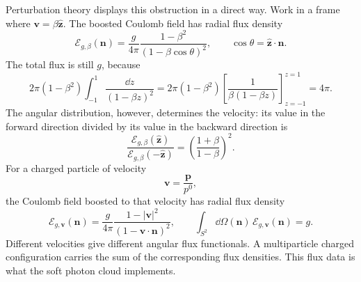 Perturbation theory displays this obstruction in a direct way.  Work in a
frame where \(\mathbf v=\beta\widehat{\mathbf z}\).  The boosted Coulomb
field has radial flux density
\[
  \mathcal E_{g,\beta}(\mathbf n)
  =
  \frac{g}{4\pi}
  \frac{1-\beta^2}{(1-\beta\cos\theta)^2},
  \qquad
  \cos\theta=\widehat{\mathbf z}\cdot\mathbf n .
\]
The total flux is still \(g\), because
\begin{equation}
  2\pi(1-\beta^2)\int_{-1}^{1}
  \frac{\dd z}{(1-\beta z)^2}
  =
  2\pi(1-\beta^2)
  \left[
    \frac1{\beta(1-\beta z)}
  \right]_{z=-1}^{z=1}
  =
  4\pi .
  \label{eq:boosted-coulomb-flux-normalization}
\end{equation}
The angular distribution, however, determines the velocity: its value in the
forward direction divided by its value in the backward direction is
\begin{equation}
  \frac{\mathcal E_{g,\beta}(\widehat{\mathbf z})}
       {\mathcal E_{g,\beta}(-\widehat{\mathbf z})}
  =
  \left(\frac{1+\beta}{1-\beta}\right)^2 .
  \label{eq:boosted-coulomb-flux-velocity-ratio}
\end{equation}
For a charged particle of velocity
\[
  \mathbf v=\frac{\mathbf p}{p^0},
\]
the Coulomb field boosted to that velocity has radial flux density
\begin{equation}
  \mathcal E_{g,\mathbf v}(\mathbf n)
  =
  \frac{g}{4\pi}
  \frac{1-|\mathbf v|^2}
       {(1-\mathbf v\cdot\mathbf n)^2},
  \qquad
  \int_{S^2}\dd\Omega(\mathbf n)\,
  \mathcal E_{g,\mathbf v}(\mathbf n)=g .
  \label{eq:boosted-coulomb-flux-density}
\end{equation}
Different velocities give different angular flux functionals.  A multiparticle
charged configuration carries the sum of the corresponding flux densities.
This flux data is what the soft photon cloud implements.

